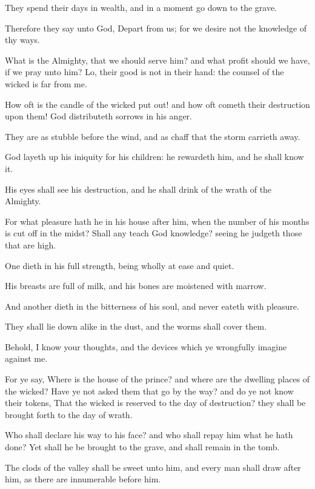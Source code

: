 \verse They spend their days in wealth, and in a moment go down to the grave.

\verse Therefore they say unto God, Depart from us; for we desire not the knowledge of thy ways.

\verse What is the Almighty, that we should serve him? and what profit should we have, if we pray unto him?  \verse Lo, their good is not in their hand: the counsel of the wicked is far from me.

\verse How oft is the candle of the wicked put out! and how oft cometh their destruction upon them! God distributeth sorrows in his anger.

\verse They are as stubble before the wind, and as chaff that the storm carrieth away.

\verse God layeth up his iniquity for his children: he rewardeth him, and he shall know it.

\verse His eyes shall see his destruction, and he shall drink of the wrath of the Almighty.

\verse For what pleasure hath he in his house after him, when the number of his months is cut off in the midst?  \verse Shall any teach God knowledge? seeing he judgeth those that are high.

\verse One dieth in his full strength, being wholly at ease and quiet.

\verse His breasts are full of milk, and his bones are moistened with marrow.

\verse And another dieth in the bitterness of his soul, and never eateth with pleasure.

\verse They shall lie down alike in the dust, and the worms shall cover them.

\verse Behold, I know your thoughts, and the devices which ye wrongfully imagine against me.

\verse For ye say, Where is the house of the prince? and where are the dwelling places of the wicked?  \verse Have ye not asked them that go by the way? and do ye not know their tokens, \verse That the wicked is reserved to the day of destruction? they shall be brought forth to the day of wrath.

\verse Who shall declare his way to his face? and who shall repay him what he hath done?  \verse Yet shall he be brought to the grave, and shall remain in the tomb.

\verse The clods of the valley shall be sweet unto him, and every man shall draw after him, as there are innumerable before him.

